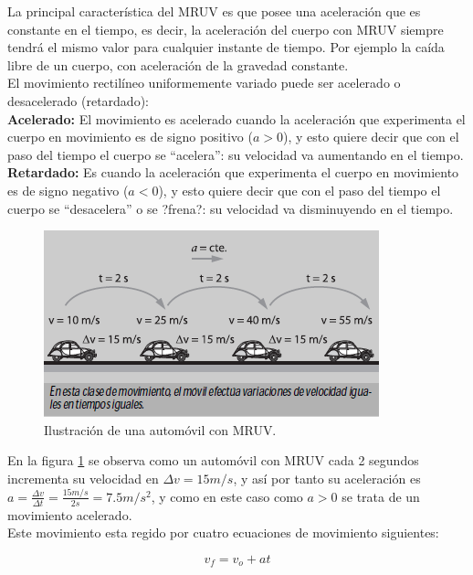 \documentclass[a5paper,pagesize,10pt,bibtotoc,pointlessnumbers,
normalheadings,DIV=9,fleqn,x11names,table,twoside=false]{scrbook}
\begin{document}
La principal característica del MRUV es que posee una aceleración que es constante en el tiempo, es decir, la aceleración del 
cuerpo con MRUV siempre tendrá el mismo valor para cualquier instante de tiempo. Por ejemplo la caída libre de un cuerpo, con 
aceleración de la gravedad constante.\\

El movimiento rectilíneo uniformemente variado puede ser acelerado o desacelerado (retardado):\\

\textbf{Acelerado:} El movimiento es acelerado cuando la aceleración que experimenta el cuerpo en movimiento es de signo positivo 
($a > 0$), y esto quiere decir que con el paso del tiempo el cuerpo se ``acelera'': su velocidad va aumentando en el tiempo.\\

\textbf{Retardado:} Es cuando la aceleración que experimenta el cuerpo en movimiento es de signo negativo ($a < 0$), y esto 
quiere decir que con el paso del tiempo el cuerpo se ``desacelera'' o se ?frena?: su velocidad va disminuyendo en el tiempo.\\

\begin{figure}[ht]
 \centering
 \includegraphics[scale=0.7]{images/mruv.png}
 \caption{Ilustración de una automóvil con MRUV.}\label{mruv}
\end{figure} 

En la figura \ref{mruv} se observa como un automóvil con MRUV cada 2 segundos incrementa su velocidad en $\Delta v = 15 m/s$, y 
así por tanto su aceleración es $a = \frac{\Delta v}{\Delta t} = \frac{15 m/s}{2s} = 7.5 m/s^2$, y como en este caso como $a>0$ 
se trata de un movimiento acelerado.\\

Este movimiento esta regido por cuatro ecuaciones de movimiento siguientes:

\begin{equation}
 v_f = v_o + at
\end{equation}
\end{document}
